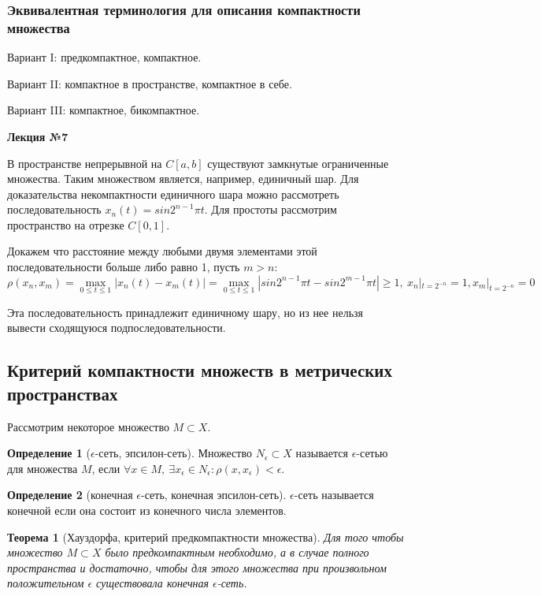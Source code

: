 \documentclass[14pt,a4paper]{extarticle}
\newtheorem{theorem}{Теорема}[section]
\theoremstyle{definition}
\newtheorem{definition}{Определение}[section]
\theoremstyle{remark}
\renewcommand{\[}{\begin{dmath*}[compact]}
\renewcommand{\]}{\end{dmath*}}
\newcommand{\sep}{ , \ \allowbreak }
\begin{document}
\subsubsection{Эквивалентная терминология для описания компактности множества}

Вариант I: предкомпактное, компактное.

Вариант II: компактное в пространстве, компактное в себе.

Вариант III: компактное, бикомпактное.

\textbf{Лекция №7}

В пространстве непрерывной на $C[a,b]$ существуют замкнутые
ограниченные множества.
Таким множеством является, например, единичный шар.
Для доказательства некомпактности единичного шара можно рассмотреть
последовательность $x_n(t)=sin2^{n-1}\pi t$.
Для простоты рассмотрим пространство на отрезке $C[0,1]$.

Докажем что расстояние между любыми двумя элементами этой последовательности
больше либо равно 1, пусть $m>n$:
\[\rho(x_n,x_m) = {\max_{0\leq t \leq 1} |x_n(t)-x_m(t)|} \allowbreak=
\max_{0\leq t \leq 1} |sin 2^{n-1}\pi t-\allowbreak
sin 2^{m-1}\pi t|\geq 1 \sep x_n|_{t=2^{-n}}=1, x_m|_{t=2^{-n}}=0 \]

Эта последовательность принадлежит единичному шару,
но из нее нельзя вывести сходящуюся подпоследовательности.

\subsection{Критерий компактности множеств в метрических пространствах}

Рассмотрим некоторое множество $M\subset X$.

\begin{definition}[$\epsilon$-сеть, эпсилон-сеть]
  Множество $N_{\epsilon} \subset X$ называется $\epsilon$-сетью для
  множества $M$, если $\forall x \in M \sep \exists x_{\epsilon}
  \in N_{\epsilon}: \rho(x,x_{\epsilon})<\epsilon$.
\end{definition}
\begin{definition}[конечная $\epsilon$-сеть, конечная эпсилон-сеть]
  $\epsilon$-сеть называется конечной если она состоит из
  конечного числа элементов.
\end{definition}

\begin{theorem}[Хауздорфа, критерий предкомпактности множества]
  Для того чтобы множество $M \subset X$ было предкомпактным необходимо,
  а в случае полного пространства и достаточно,
  чтобы для этого множества при произвольном положительном $\epsilon$
  существовала конечная $\epsilon$-сеть.
\end{theorem}
\end{document}

